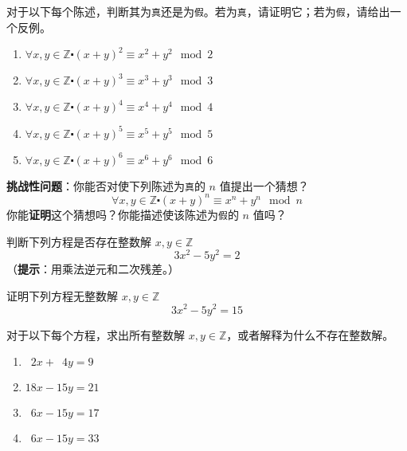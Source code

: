 \begin{exercise}\label{exc:exercises6.7.22}
    对于以下每个陈述，判断其为\verb|真|还是为\verb|假|。若为\verb|真|，请证明它；若为\verb|假|，请给出一个反例。
    \begin{enumerate}[label=(\alph*)]
        \item $\forall x, y \in \mathbb{Z} \centerdot (x + y)^2 \equiv x^2 + y^2 \mod 2$
        \item $\forall x, y \in \mathbb{Z} \centerdot (x + y)^3 \equiv x^3 + y^3 \mod 3$
        \item $\forall x, y \in \mathbb{Z} \centerdot (x + y)^4 \equiv x^4 + y^4 \mod 4$
        \item $\forall x, y \in \mathbb{Z} \centerdot (x + y)^5 \equiv x^5 + y^5 \mod 5$
        \item $\forall x, y \in \mathbb{Z} \centerdot (x + y)^6 \equiv x^6 + y^6 \mod 6$
    \end{enumerate}
    \textbf{挑战性问题}：你能否对使下列陈述为\verb|真|的 $n$ 值提出一个猜想？
    \[\forall x, y \in \mathbb{Z} \centerdot (x + y)^n \equiv x^n + y^n \mod n\]
    你能\textbf{证明}这个猜想吗？你能描述使该陈述为\verb|假|的 $n$ 值吗？
\end{exercise}

\clearpage

\begin{exercise}
    判断下列方程是否存在整数解 $x, y \in \mathbb{Z}$
    \[3x^2 - 5y^2 = 2\]
    （\textbf{提示}：用乘法逆元和二次残差。）
\end{exercise}

\begin{exercise}
    证明下列方程无整数解 $x, y \in \mathbb{Z}$
    \[3x^2 - 5y^2 = 15\]
\end{exercise}

\begin{exercise}
    对于以下每个方程，求出所有整数解 $x, y \in \mathbb{Z}$，或者解释为什么不存在整数解。
    \begin{enumerate}[label=(\alph*)]
        \item $\enspace 2x + \enspace 4y = 9$
        \item $18x - 15y = 21$
        \item $\enspace 6x - 15y = 17$
        \item $\enspace 6x - 15y = 33$
    \end{enumerate}
\end{exercise}

